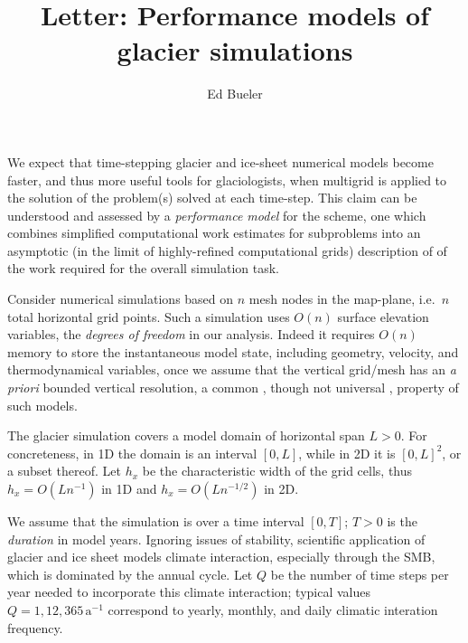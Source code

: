 \documentclass[twocolumn,letterpaper]{igs}
\begin{document}
\title[Performance models of glacier simulations]{Letter: Performance models of glacier simulations}


\author{Ed Bueler}



\maketitle

\sectionsize

We expect that time-stepping glacier and ice-sheet numerical models become faster, and thus more useful tools for glaciologists, when multigrid is applied to the solution of the problem(s) solved at each time-step.  This claim can be understood and assessed by a \emph{performance model} for the scheme, one which combines simplified computational work estimates for subproblems into an asymptotic (in the limit of highly-refined computational grids) description of of the work required for the overall simulation task.

Consider numerical simulations based on $n$ mesh nodes in the map-plane, i.e.~$n$ total horizontal grid points.  Such a simulation uses $O(n)$ surface elevation variables, the \emph{degrees of freedom} in our analysis.  Indeed it requires $O(n)$ memory to store the instantaneous model state, including geometry, velocity, and thermodynamical variables, once we assume that the vertical grid/mesh has an \emph{a priori} bounded vertical resolution, a common \citep[for example]{Brinkerhoffetal2017,Hoffmanetal2018}, though not universal \citep{IsaacStadlerGhattas2015}, property of such models.

The glacier simulation covers a model domain of horizontal span $L>0$.  For concreteness, in 1D the domain is an interval $[0,L]$, while in 2D it is $[0,L]^2$, or a subset thereof.  Let $h_x$ be the characteristic width of the grid cells, thus $h_x = O(L n^{-1})$ in 1D and $h_x = O(L n^{-1/2})$ in 2D.

We assume that the simulation is over a time interval $[0,T]$; $T>0$ is the \emph{duration} in model years.  Ignoring issues of stability, scientific application of glacier and ice sheet models climate interaction, especially through the SMB, which is dominated by the annual cycle.  Let $Q$ be the number of time steps per year needed to incorporate this climate interaction; typical values $Q=1,12,365 \,\text{a}^{-1}$ correspond to yearly, monthly, and daily climatic interation frequency.
\end{document}
